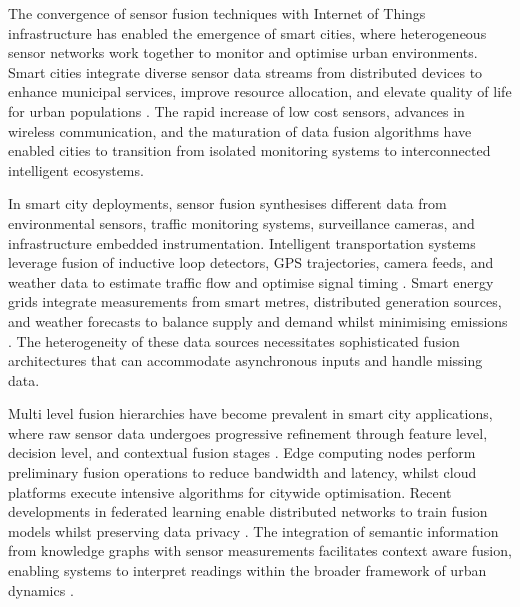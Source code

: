 \documentclass[journal]{IEEEtran}
\begin{document}
The convergence of sensor fusion techniques with Internet of Things infrastructure has enabled the emergence of smart cities, where heterogeneous sensor networks work together to monitor and optimise urban environments. Smart cities integrate diverse sensor data streams from distributed devices to enhance municipal services, improve resource allocation, and elevate quality of life for urban populations \cite{zanella_internet_2014, jin_information_2014}. The rapid increase of low cost sensors, advances in wireless communication, and the maturation of data fusion algorithms have enabled cities to transition from isolated monitoring systems to interconnected intelligent ecosystems.

In smart city deployments, sensor fusion synthesises different data from environmental sensors, traffic monitoring systems, surveillance cameras, and infrastructure embedded instrumentation. Intelligent transportation systems leverage fusion of inductive loop detectors, GPS trajectories, camera feeds, and weather data to estimate traffic flow and optimise signal timing \cite{lv_traffic_2015, guerrero-ibanez_adaptive_2018}. Smart energy grids integrate measurements from smart metres, distributed generation sources, and weather forecasts to balance supply and demand whilst minimising emissions \cite{fang_smart_2012}. The heterogeneity of these data sources necessitates sophisticated fusion architectures that can accommodate asynchronous inputs and handle missing data.

Multi level fusion hierarchies have become prevalent in smart city applications, where raw sensor data undergoes progressive refinement through feature level, decision level, and contextual fusion stages \cite{gao_survey_2020}. Edge computing nodes perform preliminary fusion operations to reduce bandwidth and latency, whilst cloud platforms execute intensive algorithms for citywide optimisation. Recent developments in federated learning enable distributed networks to train fusion models whilst preserving data privacy \cite{lim_federated_2020}. The integration of semantic information from knowledge graphs with sensor measurements facilitates context aware fusion, enabling systems to interpret readings within the broader framework of urban dynamics \cite{petrolo_semantic_2017}.
\end{document}
